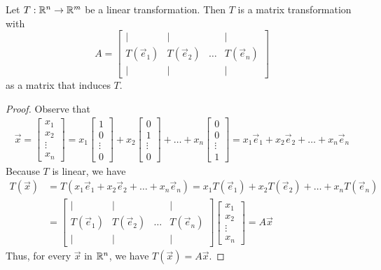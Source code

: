\documentclass{ximera}
\begin{document}
\begin{theorem}\label{th:matlin} Let $T:\mathbb{R}^n\rightarrow\mathbb{R}^m$ be a linear transformation.  Then $T$ is a matrix transformation with
  \begin{equation*} \label{matlintrans}
 A=\begin{bmatrix}
           | & |& &|\\
		T(\vec{e}_1) & T(\vec{e}_2)&\dots &T(\vec{e}_n)\\
		|&| & &|
         \end{bmatrix}
\end{equation*}
as a matrix that induces $T$.
\end{theorem}

\begin{proof}  Observe that
\begin{align*}\vec{x}=\begin{bmatrix}x_1\\x_2\\\vdots\\x_n\end{bmatrix}=x_1\begin{bmatrix}1\\0\\\vdots\\0\end{bmatrix}+x_2\begin{bmatrix}0\\1\\\vdots\\0\end{bmatrix}+\dots+x_n\begin{bmatrix}0\\0\\\vdots\\1\end{bmatrix}=x_1\vec{e}_1+x_2\vec{e}_2+\dots+x_n\vec{e}_n
\end{align*}
Because $T$ is linear, we have
\begin{align*}
T(\vec{x})&=T(x_1\vec{e}_1+x_2\vec{e}_2+\dots+x_n\vec{e}_n)=x_1T(\vec{e}_1)+x_2T(\vec{e}_2)+\dots+x_nT(\vec{e}_n)\\
&=\begin{bmatrix}
           | & |& &|\\
		T(\vec{e}_1) & T(\vec{e}_2)&\dots &T(\vec{e}_n)\\
		|&| & &|
         \end{bmatrix}\begin{bmatrix}x_1\\x_2\\\vdots\\x_n\end{bmatrix}=A\vec{x}
\end{align*}
Thus, for every $\vec{x}$ in $\mathbb{R}^n$, we have $T(\vec{x})=A\vec{x}$. 
\end{proof}
 
\end{document}
